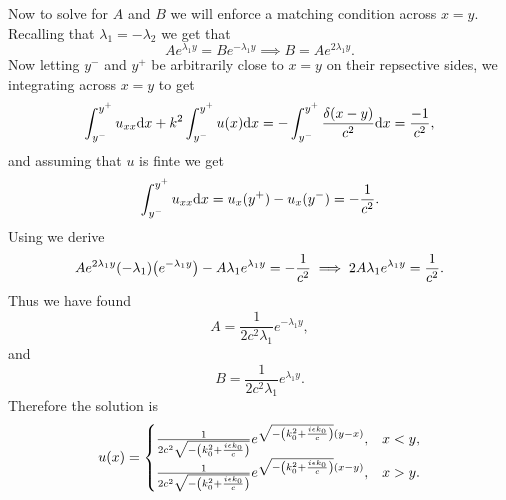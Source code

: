 \documentclass[12pt]{report}
\begin{document}
\begin{solution}
\begin{enumerate}
        Now to solve for $A$ and $B$ we will enforce a matching condition across $x = y$. Recalling that $\lambda_1 = -\lambda_2$ we get that 
        \[
            A e^{\lambda_1 y} = B e^{-\lambda_1 y} \implies B = A e^{2\lambda_1 y}.
        \]  
        Now letting $y^-$ and $y^+$ be arbitrarily close to $x = y$ on their repsective sides, we integrating across $x=y$ to get 
        \[
            \int_{y^-}^{y^+} u_{xx}{\mathrm{d}} x +  k^2\int_{y^-}^{y^+} u(x) {\mathrm{d}} x = -\int_{y^-}^{y^+} \frac{\delta(x -y)}{c^2} {\mathrm{d}} x = \frac{-1}{c^2},
        \] 
        and assuming that $u$ is finte we get
        \[
            \int_{y^-}^{y^+} u_{xx}{\mathrm{d}} x = u_x(y^+) - u_x(y^-) = - \frac{1}{c^2}.
        \]
        Using  we derive
        \[
            Ae^{2\lambda_1 y}(-\lambda_1){\left(e^{-\lambda_1 y}\right)} - A \lambda_1e^{\lambda_1 y} = - \frac{1}{c^2} \implies 2A \lambda_1 e^{\lambda_1 y} = \frac{1}{c^2}. 
        \]
        Thus we have found 
        \[
            A = \frac{1}{2c^2\lambda_1}e^{-\lambda_1 y},
        \]
        and 
        \[
            B = \frac{1}{2c^2\lambda_1}e^{\lambda_1 y}.
        \]
        Therefore the solution is
        \[
            u(x) = \begin{cases}
                \frac{1}{2c^2\sqrt{-{\left(k_0^2 + \frac{i{\epsilon} k_0}{c}\right)}}}e^{\sqrt{-{\left(k_0^2 + \frac{i{\epsilon} k_0}{c}\right)}}(y-x)}, &x<y,\\
                \frac{1}{2c^2\sqrt{-{\left(k_0^2 + \frac{i{\epsilon} k_0}{c}\right)}}}e^{\sqrt{-{\left(k_0^2 + \frac{i{\epsilon} k_0}{c}\right)}}(x-y)}, &x>y.\\
            \end{cases}
        \]



\end{enumerate}
\end{solution}
\end{document}
